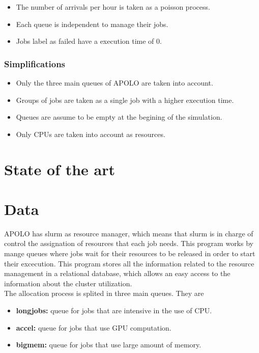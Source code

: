 \documentclass{wscpaperproc}
\begin{document}
\begin{itemize}
    \item The number of arrivals per hour is taken as a poisson process.
    \item Each queue is independent to manage their jobs.
    \item Jobs label as failed have a execution time of 0.
\end{itemize}

\subsubsection{Simplifications}

\begin{itemize}
    \item Only the three main queues of APOLO are taken into account.
    \item Groups of jobs are taken as a single job with a higher execution time.
    \item Queues are assume to be empty at the begining of the simulation.
    \item Only CPUs are taken into account as resources.
\end{itemize}

\section{State of the art}

\section{Data}

APOLO has slurm \cite{slurm} as resource manager, which means that slurm is in
charge of control the assignation of resources that each job needs. This program
works by mange queues where jobs wait for their resources to be released in
order to start their excecution. This program stores all the information related
to the resource management in a relational database, which allows an easy
access to the information about the cluster utilization.\\

The allocation process is splited in three main queues. They are
\begin{itemize}
    \item \textbf{longjobs:} queue for jobs that are intensive in the use of CPU.
    \item \textbf{accel:} queue for jobs that use GPU computation.
    \item \textbf{bigmem:} queue for jobs that use large amount of memory.
\end{itemize}
\end{document}
